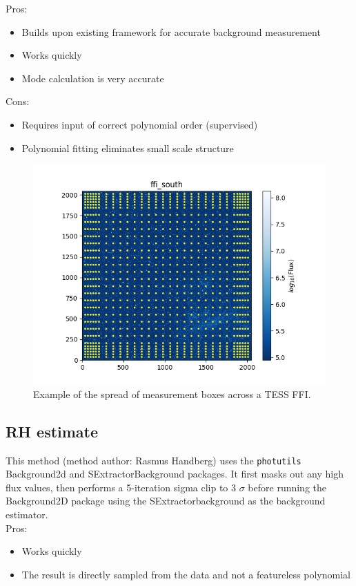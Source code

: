 \documentclass[10pt, a4paper]{article}
\begin{document}
Pros:
\begin{itemize}
\item Builds upon existing framework for accurate background measurement
\item Works quickly
\item Mode calculation is very accurate
\end{itemize}
Cons:
\begin{itemize}
\item Requires input of correct polynomial order (supervised)
\item Polynomial fitting eliminates small scale structure
\end{itemize}

\begin{figure}[h!]
\includegraphics[width=\textwidth]{OH_example}
\caption{Example of the spread of measurement boxes across a TESS FFI.}
\label{fig:ojh}
\end{figure}


\subsection{RH estimate}
This method (method author: Rasmus Handberg) uses the \texttt{photutils} Background2d and SExtractorBackground packages. It first masks out any high flux values, then performs a 5-iteration sigma clip to 3 $\sigma$ before running the Background2D package using the SExtractorbackground as the background estimator. \\

Pros:
\begin{itemize}
\item Works quickly
\item The result is directly sampled from the data and not a featureless polynomial
\end{itemize}
\end{document}
